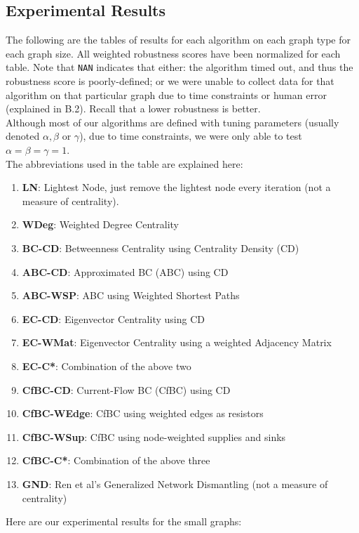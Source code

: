 \documentclass{article}
\begin{document}
\subsection{Experimental Results}
The following are the tables of results for each algorithm on each graph type for each graph size. All weighted robustness scores have been normalized for each table. Note that \texttt{NAN} indicates that either: the algorithm timed out, and thus the robustness score is poorly-defined; or we were unable to collect data for that algorithm on that particular graph due to time constraints or human error (explained in B.2). Recall that a lower robustness is better.\\

Although most of our algorithms are defined with tuning parameters (usually denoted $\alpha, \beta$ or $\gamma$), due to time constraints, we were only able to test $\alpha = \beta = \gamma = 1$. \\

The abbreviations used in the table are explained here:
\begin{enumerate}
    \item \textbf{LN}: Lightest Node, just remove the lightest node every iteration (not a measure of centrality).
    \item \textbf{WDeg}: Weighted Degree Centrality
    \item \textbf{BC-CD}: Betweenness Centrality using Centrality Density (CD)
    \item \textbf{ABC-CD}: Approximated BC (ABC) using CD 
    \item \textbf{ABC-WSP}: ABC using Weighted Shortest Paths
    \item \textbf{EC-CD}: Eigenvector Centrality using CD
    \item \textbf{EC-WMat}: Eigenvector Centrality using a weighted Adjacency Matrix
    \item \textbf{EC-C*}: Combination of the above two
    \item \textbf{CfBC-CD}: Current-Flow BC (CfBC) using CD
    \item \textbf{CfBC-WEdge}: CfBC using weighted edges as resistors
    \item \textbf{CfBC-WSup}: CfBC using node-weighted supplies and sinks
    \item \textbf{CfBC-C*}: Combination of the above three
    \item \textbf{GND}: Ren et al's Generalized Network Dismantling (not a measure of centrality) \cite{gnd}
\end{enumerate}
Here are our experimental results for the small graphs: \\
 \\
\end{document}
